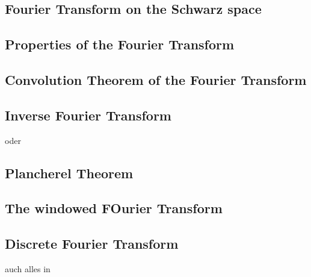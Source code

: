 \documentclass[a4paper,11pt,bibliography=totoc,listof=totoc,headinclude=true,cleardoublepage=empty,oneside]{scrbook}
\theoremstyle{definition}
\theoremstyle{remark}
\begin{document}
 \subsection{Fourier Transform on the Schwarz space} 
  \cite[Chapter 5, Section 1.4]{steinFourierAnalysisIntroduction2003a}
  \cite[Definition 16.5]{serovFourierSeriesFourier2017}

 \subsection{Properties of the Fourier Transform} %
  \cite[page 136, definition 16.8]{serovFourierSeriesFourier2017} 

 \subsection{Convolution Theorem of the Fourier Transform}
  \cite[Chapter 2, Section 3]{steinFourierAnalysisIntroduction2003a}
  \cite[Chapter 2, Proposition 3.1]{steinFourierAnalysisIntroduction2003a}
  \cite[S.32, 33]{cooleyFastFourierTransform1969} 

 \subsection{Inverse Fourier Transform} %
  \cite[Chapter 5, Section 1.5]{steinFourierAnalysisIntroduction2003a}
  \cite[Chapter 5, Theorem 1.9 - Fourier Inversion]{steinFourierAnalysisIntroduction2003a} %
  oder \cite[Theorem 16.10 - Fourier Inversion]{serovFourierSeriesFourier2017}

 \subsection{Plancherel Theorem} %
  \cite[Chapter 5, Section 1.6]{steinFourierAnalysisIntroduction2003a}
  \cite[Chapter 5, Theorem 1.12]{steinFourierAnalysisIntroduction2003a}
  \cite[Theorem 17.5 - Plancherel Theorem]{serovFourierSeriesFourier2017}

 \subsection{The windowed FOurier Transform}


 \subsection{Discrete Fourier Transform} %
  \cite[Chapter 11, introduchtion]{serovFourierSeriesFourier2017}
  \cite[Definition 11.1]{serovFourierSeriesFourier2017} %
  \cite[Definition 11.2]{serovFourierSeriesFourier2017} %
  \cite[Corollary 11.4]{serovFourierSeriesFourier2017} %
  \cite[Definition 11.7]{serovFourierSeriesFourier2017} %
  auch alles in \cite[S.28]{cooleyFastFourierTransform1969}
\end{document}
